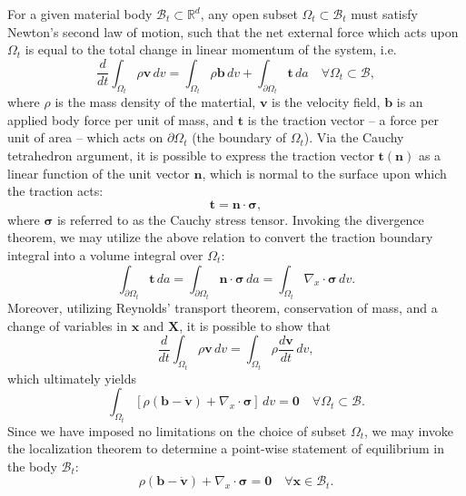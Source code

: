 For a given material body $\mathcal{B}_t \subset \mathbb{R}^d$, any open subset $\Omega_t \subset \mathcal{B}_t$ must satisfy Newton's second law of motion, such that the net external force which acts upon $\Omega_t$ is equal to the total change in linear momentum of the system, i.e.
\begin{equation}
  \frac{d}{dt} \int_{\Omega_t} \rho \mathbf{v} \, dv = \int_{\Omega_t} \rho \mathbf{b} \, dv + \int_{\partial \Omega_t} \mathbf{t} \, da \quad \forall \Omega_t \subset \mathcal{B},
\end{equation}
where $\rho$ is the mass density of the matertial, $\mathbf{v}$ is the velocity field, $\mathbf{b}$ is an applied body force per unit of mass, and $\mathbf{t}$ is the traction vector -- a force per unit of area -- which acts on $\partial \Omega_t$ (the boundary of $\Omega_t$). Via the Cauchy tetrahedron argument, it is possible to express the traction vector $\mathbf{t} (\mathbf{n})$ as a linear function of the unit vector $\mathbf{n}$, which is normal to the surface upon which the traction acts:
\begin{equation}
  \mathbf{t} = \mathbf{n} \cdot \boldsymbol{\sigma},
\end{equation}
where $\boldsymbol{\sigma}$ is referred to as the Cauchy stress tensor. Invoking the divergence theorem, we may utilize the above relation to convert the traction boundary integral into a volume integral over $\Omega_t$:
\begin{equation}
  \int_{\partial \Omega_t} \mathbf{t} \, da = \int_{\partial \Omega_t} \mathbf{n} \cdot \boldsymbol{\sigma} \, da = \int_{\Omega_t} \nabla_x \cdot \boldsymbol{\sigma} \, dv.
\end{equation}
Moreover, utilizing Reynolds' transport theorem, conservation of mass, and a change of variables in $\mathbf{x}$ and $\mathbf{X}$, it is possible to show that
\begin{equation}
  \frac{d}{dt} \int_{\Omega_t} \rho \mathbf{v} \, dv = \int_{\Omega_t} \rho \frac{d \mathbf{v}}{dt} \, dv,
\end{equation}
which ultimately yields
\begin{equation}
  \int_{\Omega_t} \left[ \rho (\mathbf{b} - \dot{\mathbf{v}}) + \nabla_x \cdot \boldsymbol{\sigma} \right] \, dv = \mathbf{0} \quad \forall \Omega_t \subset \mathcal{B}.
\end{equation}
Since we have imposed no limitations on the choice of subset $\Omega_t$, we may invoke the localization theorem to determine a point-wise statement of equilibrium in the body $\mathcal{B}_t$:
\begin{equation}
  \rho (\mathbf{b} - \dot{\mathbf{v}}) + \nabla_x \cdot \boldsymbol{\sigma} = \mathbf{0} \quad \forall \mathbf{x} \in \mathcal{B}_t.
\end{equation}


